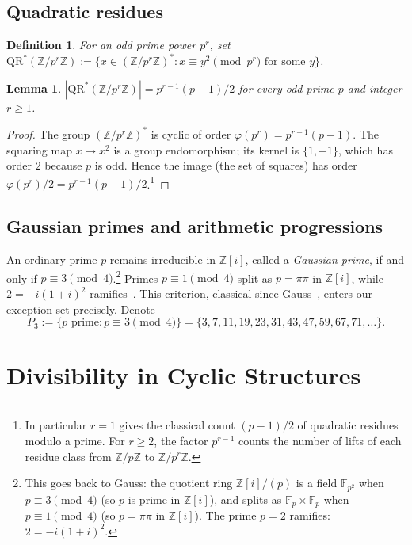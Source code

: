 \documentclass[12pt]{amsart}
\theoremstyle{bluehead}
\newtheorem{lemma}[theorem]{Lemma}
\theoremstyle{orangehead}
\newtheorem{definition}[theorem]{Definition}
\theoremstyle{greenhead}
\newcommand{\Z}{\mathbb{Z}}
\newcommand{\QRS}{\mathrm{QR}^{*}}
\renewcommand{\phi}{\varphi}
\begin{document}
\subsection*{Quadratic residues}

\begin{definition}
  For an odd prime power $p^r$, set
  $\QRS(\Z/p^r\Z):=\{x\in(\Z/p^r\Z)^*: x\equiv y^2\pmod{p^r}
  \text{ for some }y\}$.
\end{definition}

\begin{lemma}\label{lem:qr}
  $|\QRS(\Z/p^r\Z)|=p^{r-1}(p-1)/2$ for every odd prime $p$ and
  integer $r\ge1$.
\end{lemma}

\begin{proof}
  The group $(\Z/p^r\Z)^*$ is cyclic of order $\phi(p^r)=p^{r-1}(p-1)$.
  The squaring map $x\mapsto x^2$ is a group endomorphism; its kernel is
  $\{1,-1\}$, which has order $2$ because $p$ is odd.
  Hence the image (the set of squares) has order
  $\phi(p^r)/2=p^{r-1}(p-1)/2$.\footnote{In particular $r=1$ gives the classical
  count $(p-1)/2$ of quadratic residues modulo a prime.  For $r\ge2$,
  the factor $p^{r-1}$ counts the number of lifts of each residue
  class from $\Z/p\Z$ to $\Z/p^r\Z$.}
\qedhere
\end{proof}

\subsection*{Gaussian primes and arithmetic progressions}

An ordinary prime $p$ remains irreducible in $\Z[i]$, called a \emph{Gaussian prime},
if and only if $p\equiv3\pmod4$.\footnote{%
  This goes back to Gauss: the quotient ring $\Z[i]/(p)$ is a field
  $\mathbb{F}_{p^2}$ when $p\equiv3\pmod4$ (so $p$ is prime in $\Z[i]$),
  and splits as $\mathbb{F}_p\times\mathbb{F}_p$ when $p\equiv1\pmod4$
  (so $p=\pi\bar\pi$ in $\Z[i]$).  The prime $p=2$ ramifies: $2=-i(1+i)^2$.}
Primes $p\equiv1\pmod4$ split as $p=\pi\bar\pi$ in $\Z[i]$, while
$2=-i(1+i)^2$ ramifies~\cite{ireland1990}.
This criterion, classical since Gauss~\cite{niven1991}, enters our exception set
precisely.  Denote
\[
  P_3:=\{p\text{ prime}:p\equiv3\pmod4\}
  =\{3,7,11,19,23,31,43,47,59,67,71,\ldots\}.
\]

\section{Divisibility in Cyclic Structures}\label{sec:cyclic}
\end{document}

